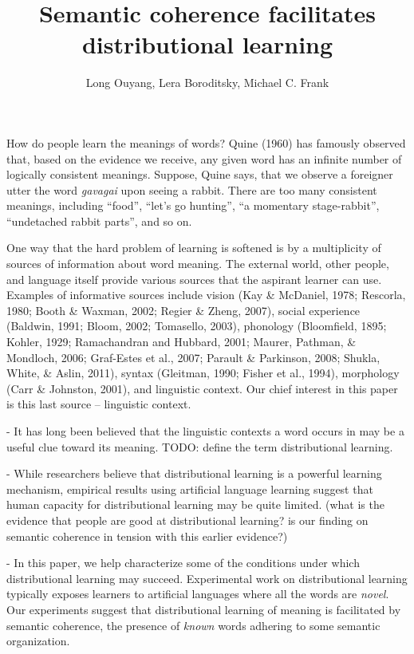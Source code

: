 \documentclass[man,floatsintext]{apa6}
\title{Semantic coherence facilitates distributional learning}
\author{Long Ouyang, Lera Boroditsky, Michael C. Frank}
\affiliation{Stanford University}
\begin{document}
\maketitle

How do people learn the meanings of words? Quine (1960) has famously observed that, based on the evidence we receive, any given word has an infinite number of logically consistent meanings. Suppose, Quine says, that we observe a foreigner utter the word \emph{gavagai} upon seeing a rabbit. There are too many consistent meanings, including ``food'', ``let's go hunting'', ``a momentary stage-rabbit'', ``undetached rabbit parts'', and so on.

One way that the hard problem of learning is softened is by a multiplicity of sources of information about word meaning. The external world, other people, and language itself provide various sources that the aspirant learner can use. Examples of informative sources include vision (Kay \& McDaniel, 1978; Rescorla, 1980; Booth \& Waxman, 2002; Regier \& Zheng, 2007), social experience (Baldwin, 1991; Bloom, 2002; Tomasello, 2003), phonology (Bloomfield, 1895; Kohler, 1929; Ramachandran and Hubbard, 2001; Maurer, Pathman, \& Mondloch, 2006; Graf-Estes et al., 2007; Parault \& Parkinson, 2008; Shukla, White, \& Aslin, 2011), syntax (Gleitman, 1990; Fisher et al., 1994), morphology (Carr \& Johnston, 2001), and linguistic context. Our chief interest in this paper is this last source -- linguistic context.

- It has long been believed that the linguistic contexts a word occurs in may be a useful clue toward its meaning. TODO: define the term distributional learning.

- While researchers believe that distributional learning is a powerful learning mechanism, empirical results using artificial language learning suggest that human capacity for distributional learning may be quite limited.
(what is the evidence that people are good at distributional learning?
is our finding on semantic coherence in tension with this earlier evidence?)
 
- In this paper, we help characterize some of the conditions under which distributional learning may succeed. Experimental work on distributional learning typically exposes learners to artificial languages where all the words are \emph{novel}. Our experiments suggest that distributional learning of meaning is facilitated by semantic coherence, the presence of \emph{known} words adhering to some semantic organization.
\end{document}
